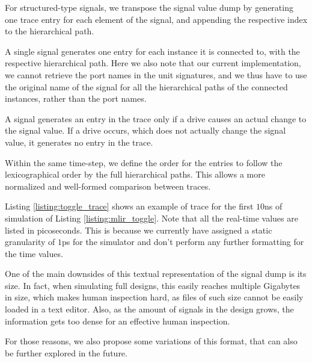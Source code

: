 For structured-type signals, we transpose the signal value dump by generating one trace entry for each element of the signal, and appending the respective index to the hierarchical path.

A single signal generates one entry for each instance it is connected to, with the respective hierarchical path. Here we also note that our current implementation, we cannot retrieve the port names in the unit signatures, and we thus have  to use the original name of the signal for all the hierarchical paths of the connected instances, rather than the port names.

A signal generates an entry in the trace only if a drive causes an actual change to the signal value. If a drive occurs, which does not actually change the signal value, it generates no entry in the trace.

Within the same time-step, we define the order for the entries to follow the lexicographical order by the full hierarchical paths. This allows a more normalized and well-formed comparison between traces.

Listing \ref{listing:toggle_trace} shows an example of trace for the first $10$ns of simulation of Listing \ref{listing:mlir_toggle}. Note that all the real-time values are listed in picoseconds. This is because we currently have assigned a static granularity of $1$ps for the simulator and don't perform any further formatting for the time values.


One of the main downsides of this textual representation of the signal dump is its size. In fact, when simulating full designs, this easily reaches multiple Gigabytes in size, which makes human inspection hard, as files of such size cannot be easily loaded in a text editor. Also, as the amount of signals in the design grows, the information gets too dense for an effective human inspection.

For those reasons, we also propose some variations of this format, that can also be further explored in the future.

